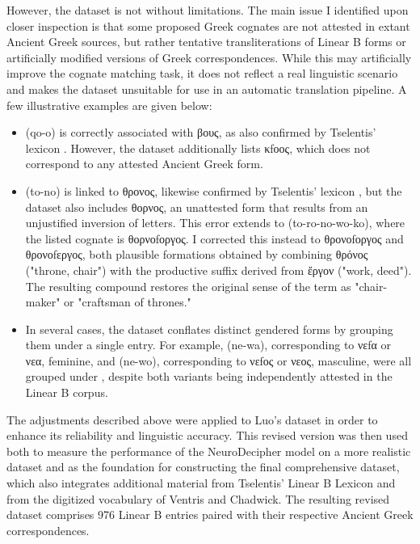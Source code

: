 However, the dataset is not without limitations.
The main issue I identified upon closer inspection is that some proposed Greek cognates are not attested in extant Ancient Greek sources, but rather tentative transliterations of Linear B forms or artificially modified versions of Greek correspondences.
While this may artificially improve the cognate matching task, it does not reflect a real linguistic scenario and makes the dataset unsuitable for use in an automatic translation pipeline.
A few illustrative examples are given below:

\begin{itemize}
\item \textlinb{\Bqo\Bo} (qo-o) is correctly associated with \textgreek{βους}, as also confirmed by Tselentis' lexicon \cite{tselentis}. However, the dataset additionally lists \textgreek{κfοος}, which does not correspond to any attested Ancient Greek form.
\item \textlinb{\Bto\Bo} (to-no) is linked to \textgreek{θρονος}, likewise confirmed by Tselentis' lexicon \cite{tselentis}, but the dataset also includes \textgreek{θορνος}, an unattested form that results from an unjustified inversion of letters.
This error extends to \textlinb{\Bto\Bro\Bno\Bwo\Bko} (to-ro-no-wo-ko), where the listed cognate is \textgreek{θορνοfοργος}. I corrected this instead to \textgreek{θρονοfοργος} and \textgreek{θρονοfεργος}, both plausible formations obtained by combining \textgreek{θρόνος} ("throne, chair") with the productive suffix derived from \textgreek{ἔργον} ("work, deed"). The resulting compound restores the original sense of the term as "chair-maker" or "craftsman of thrones."
\item In several cases, the dataset conflates distinct gendered forms by grouping them under a single entry. For example, \textlinb{\Bne\Bwa} (ne-wa), corresponding to \textgreek{νεfα} or \textgreek{νεα}, feminine, and \textlinb{\Bne\Bwo} (ne-wo), corresponding to \textgreek{νεfος} or \textgreek{νεος}, masculine, were all grouped under \textlinb{\Bne\Bwa}, despite both variants being independently attested in the Linear B corpus.
\end{itemize}

The adjustments described above were applied to Luo's dataset in order to enhance its reliability and linguistic accuracy.
This revised version was then used both to measure the performance of the NeuroDecipher model on a more realistic dataset and as the foundation for constructing the final comprehensive dataset, which also integrates additional material from Tselentis' Linear B Lexicon and from the digitized vocabulary of Ventris and Chadwick.
The resulting revised dataset comprises 976 Linear B entries paired with their respective Ancient Greek correspondences.


